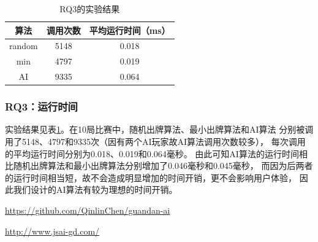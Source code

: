 \documentclass[a4paper]{ctexart}
\begin{document}
\begin{table}
	\centering
	\caption{RQ3的实验结果}
	\label{RQ3_result}
	\begin{tabular}{|c|c|c|}
		\hline
		算法 & 调用次数 & 平均运行时间（ms） \\ \hline
		random & 5148 & 0.018 \\ \hline
		min & 4797 & 0.019 \\ \hline
		AI & 9335 & 0.064 \\ \hline
	\end{tabular}
\end{table}


\subsubsection{RQ3：运行时间}

实验结果见表\ref{RQ3_result}。在10局比赛中，随机出牌算法、最小出牌算法和AI算法
分别被调用了5148、4797和9335次（因有两个AI玩家故AI算法调用次数较多），
每次调用的平均运行时间分别为0.018、0.019和0.064毫秒。
由此可知AI算法的运行时间相比随机出牌算法和最小出牌算法分别增加了0.046毫秒和0.045毫秒，
而因为后两者的运行时间相当短，故不会造成明显增加的时间开销，更不会影响用户体验，
因此我们设计的AI算法有较为理想的时间开销。

\begin{thebibliography}{99}
  \url{https://github.com/QinlinChen/guandan-ai}

  \url{http://www.jsai-gd.com/}
\end{thebibliography}
\end{document}
